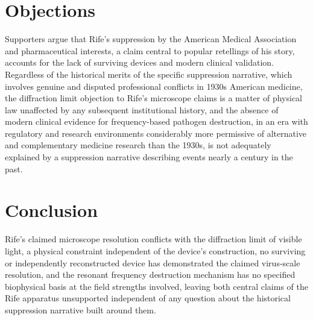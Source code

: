 \documentclass[11pt]{article}
\begin{document}
\section{Objections}

Supporters argue that Rife's suppression by the American Medical Association and pharmaceutical interests, a claim central to popular retellings of his story, accounts for the lack of surviving devices and modern clinical validation. Regardless of the historical merits of the specific suppression narrative, which involves genuine and disputed professional conflicts in 1930s American medicine, the diffraction limit objection to Rife's microscope claims is a matter of physical law unaffected by any subsequent institutional history, and the absence of modern clinical evidence for frequency-based pathogen destruction, in an era with regulatory and research environments considerably more permissive of alternative and complementary medicine research than the 1930s, is not adequately explained by a suppression narrative describing events nearly a century in the past.

\section{Conclusion}

Rife's claimed microscope resolution conflicts with the diffraction limit of visible light, a physical constraint independent of the device's construction, no surviving or independently reconstructed device has demonstrated the claimed virus-scale resolution, and the resonant frequency destruction mechanism has no specified biophysical basis at the field strengths involved, leaving both central claims of the Rife apparatus unsupported independent of any question about the historical suppression narrative built around them.
\end{document}
